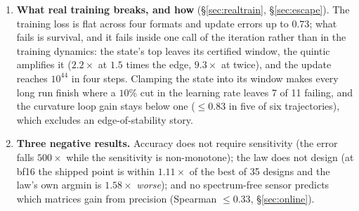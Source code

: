 \begin{enumerate}
boundary; inside it, casting the start and running the first step in bf16 cures the
divergence, and outside it the same hybrid loses to dropping a step.
\item \textbf{What real training breaks, and how} (\S\ref{sec:realtrain},
\S\ref{sec:escape}).  The training loss is flat across four formats and update errors up
to $0.73$; what fails is survival, and it fails inside one call of the iteration rather
than in the training dynamics: the state's top leaves its certified window, the quintic
amplifies it ($2.2\times$ at $1.5$ times the edge, $9.3\times$ at twice), and the update
reaches $10^{44}$ in four steps.  Clamping the state into its window makes every long run
finish where a $10\%$ cut in the learning rate leaves 7 of 11 failing, and the curvature loop
gain stays below one ($\le0.83$ in five of six trajectories), which excludes an
edge-of-stability story.
\item \textbf{Three negative results.}  Accuracy does not require sensitivity (the error
falls $500\times$ while the sensitivity is non-monotone); the law does not design (at
bf16 the shipped point is within $1.11\times$ of the best of 35 designs and the law's own
argmin is $1.58\times$ \emph{worse}); and no spectrum-free sensor predicts which matrices
gain from precision (Spearman $\le0.33$, \S\ref{sec:online}).
\end{enumerate}
